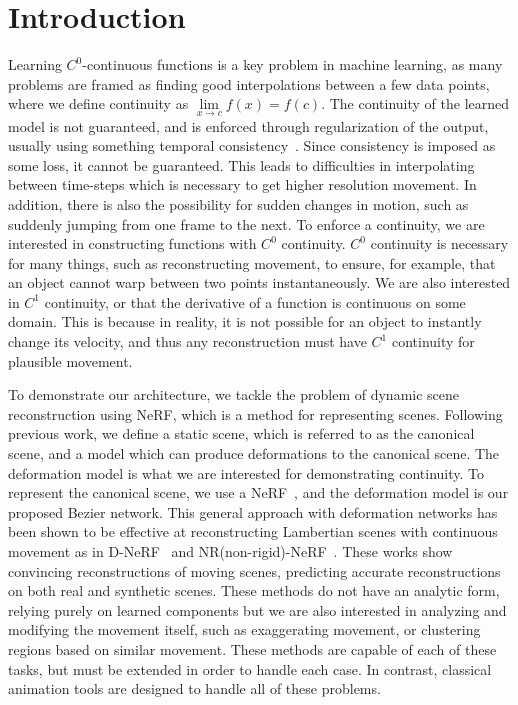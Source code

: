 \section*{Introduction}

Learning $C^0$-continuous functions is a key problem in machine learning, as many problems
are framed as finding good interpolations between a few data points, where we define continuity as $\lim\limits_{x\to c}f(x) = f(c)$.
The continuity of the learned model is not guaranteed, and is enforced through regularization of the output,
usually using something temporal consistency~\cite{tretschk2021nonrigid}. Since consistency is imposed as some loss, it cannot be guaranteed. This leads to difficulties in interpolating between time-steps which is necessary to get higher resolution movement. In addition, there is also the possibility for sudden changes in motion, such as suddenly jumping from one frame to the next.
To enforce a continuity, we are interested in constructing functions with $C^0$ continuity. $C^0$ continuity is necessary for many things, such as reconstructing movement, to ensure, for example, that an object cannot warp between two points instantaneously. We are also interested in $C^1$ continuity, or that the derivative of a function is continuous on some domain. This is because in reality, it is not possible for an object to instantly change its velocity, and thus any reconstruction must have $C^1$ continuity for plausible movement.

To demonstrate our architecture, we tackle the problem of dynamic scene reconstruction using NeRF, which is a method for representing scenes. Following previous work, we define a static scene, which is referred to as the canonical scene, and a model which can produce deformations to the canonical scene. The deformation model is what we are interested for demonstrating continuity. To represent the canonical scene, we use a NeRF~\cite{mildenhall2020nerf}, and the deformation model is our proposed Bezier network. This general approach with deformation networks has been shown to be effective at reconstructing Lambertian scenes with continuous movement as in D-NeRF~\cite{pumarola2020dnerf} and NR(non-rigid)-NeRF~\cite{tretschk2021nonrigid}. These works show convincing
reconstructions of moving scenes, predicting accurate reconstructions on both real
and synthetic scenes. These methods do not have an analytic form, relying purely on learned components but we
are also interested in analyzing and modifying the movement itself, such as
exaggerating movement, or clustering regions based on similar movement. These methods are capable of each of these tasks, but must be extended in order to handle each case. In contrast, classical animation tools are designed to handle all of these problems.

